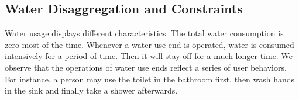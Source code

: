 \subsection{Water Disaggregation and Constraints}
Water usage displays different characteristics. 
The total water consumption is zero most of the time.
Whenever a water use end is operated, water is consumed intensively for a period of time. 
Then it will stay off for a much longer time. 
We observe that the operations of water use ends reflect a series of user behaviors. 
For instance, a person may use the toilet in the bathroom first, 
then wash hands in the sink and finally take a shower afterwards. 

